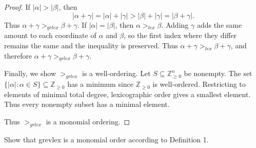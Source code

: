 \begin{proof}
    If $|\alpha| > |\beta|$, then  
    \[
    |\alpha + \gamma| = |\alpha| + |\gamma| > |\beta| + |\gamma| = |\beta + \gamma|.
    \]
    Thus $\alpha + \gamma >_{grlex} \beta + \gamma$.
    If $|\alpha| = |\beta|$, then $\alpha >_{lex} \beta$.  
    Adding $\gamma$ adds the same amount to each coordinate of $\alpha$ and $\beta$,  
        so the first index where they differ remains the same and the inequality is preserved.  
    Thus $\alpha + \gamma >_{lex} \beta + \gamma$, and therefore  
    $\alpha + \gamma >_{grlex} \beta + \gamma$.

    Finally, we show $>_{grlex}$ is a well-ordering.  
    Let $S \subseteq \mathbb{Z}_{\ge 0}^n$ be nonempty.  
    The set $\{|\alpha| : \alpha \in S\} \subseteq \mathbb{Z}_{\ge 0}$ has a minimum since $\mathbb{Z}_{\ge 0}$ is well-ordered.  
    Restricting to elements of minimal total degree, lexicographic order gives a smallest element.  
    Thus every nonempty subset has a minimal element.

    Thus $>_{grlex}$ is a monomial ordering.
\end{proof}


\begin{tcolorbox}[title=Problem 5, breakable]
    Show that grevlex is a monomial order according to Definition 1.
\end{tcolorbox}


